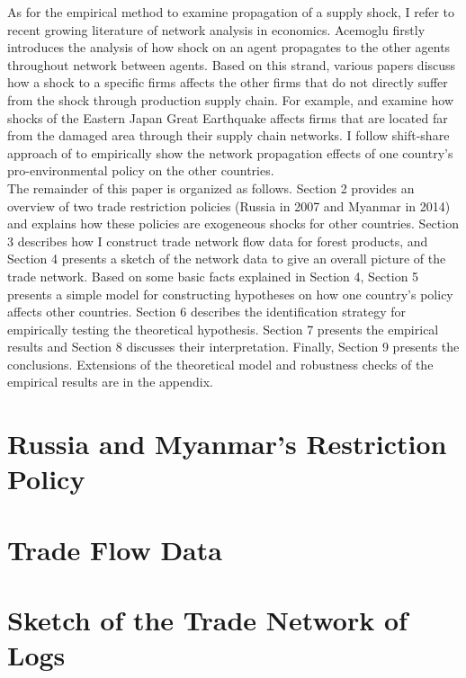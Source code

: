 \documentclass[a4paper,12pt]{article}
\begin{document}
As for the empirical method to examine propagation of a supply shock, I refer to recent growing literature of network analysis in economics. Acemoglu firstly introduces the analysis of how shock on an agent propagates to the other agents throughout network between agents. Based on this strand, various papers discuss how a shock to a specific firms affects the other firms that do not directly suffer from the shock through production supply chain. For example, \cite{barrot2016input} and \cite{carvalho2021supply} examine how shocks of the Eastern Japan Great Earthquake affects firms that are located far from the damaged area through their supply chain networks. I follow shift-share approach of \cite{huneeus2018production} to empirically show the network propagation effects of one country's pro-environmental policy on the other countries.\\

The remainder of this paper is organized as follows. Section 2 provides an overview of two trade restriction policies (Russia in 2007 and Myanmar in 2014) and explains how these policies are exogeneous shocks for other countries. Section 3 describes how I construct trade network flow data for forest products, and Section 4 presents a sketch of the network data to give an overall picture of the trade network. Based on some basic facts explained in Section 4, Section 5 presents a simple model for constructing hypotheses on how one country's policy affects other countries. Section 6 describes the identification strategy for empirically testing the theoretical hypothesis. Section 7 presents the empirical results and Section 8 discusses their interpretation. Finally, Section 9 presents the conclusions. Extensions of the theoretical model and robustness checks of the empirical results are in the appendix.\\

\cite{acemoglu2012network}

\section{Russia and Myanmar's Restriction Policy}

\section{Trade Flow Data}

\section{Sketch of the Trade Network of Logs}
\end{document}
